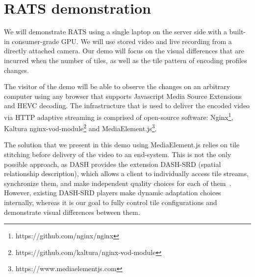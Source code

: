 \section{RATS demonstration} \label{infra}

We will demonstrate RATS using a single laptop on the server side with a built-in consumer-grade GPU. We will use stored video and live recording from a directly attached camera. Our demo will focus on the visual differences that are incurred when the number of tiles, as well as the tile pattern of encoding profiles changes.

The visitor of the demo will be able to observe the changes on an arbitrary computer using any browser that supports Javascript Media Source Extensions and HEVC decoding.
The infrastructure that is used to deliver the encoded video via HTTP adaptive streaming is comprised of open-source software: Nginx\footnote{https://github.com/nginx/nginx}, Kaltura nginx-vod-module\footnote{https://github.com/kaltura/nginx-vod-module} and MediaElement.js\footnote{https://www.mediaelementjs.com}.

The solution that we present in this demo using MediaElement.js relies on tile stitching before delivery of the video to an end-system.	
This is not the only possible approach, as DASH provides the extension DASH-SRD (spatial relationship description), which allows a client to individually access tile streams, synchronize them, and make independent quality choices for each of them~\cite{niamut2016}.
However, existing DASH-SRD players make dynamic adaptation choices internally, whereas it is our goal to fully control tile configurations and demonstrate visual differences between them.



